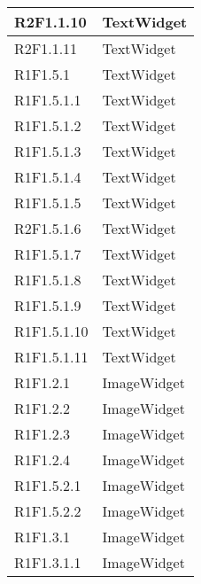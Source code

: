 \begin{center}
\begin{longtable}{|p{3cm}|p{10cm}|}
		R2F1.1.10 & TextWidget\newline \\ \hline
		R2F1.1.11 & TextWidget\newline \\ \hline
		R1F1.5.1 & TextWidget\newline \\ \hline
		R1F1.5.1.1 & TextWidget\newline \\ \hline
		R1F1.5.1.2 & TextWidget\newline \\ \hline
		R1F1.5.1.3 & TextWidget\newline \\ \hline
		R1F1.5.1.4 & TextWidget\newline \\ \hline
		R1F1.5.1.5 & TextWidget\newline \\ \hline
		R2F1.5.1.6 & TextWidget\newline \\ \hline
		R1F1.5.1.7 & TextWidget\newline \\ \hline
		R1F1.5.1.8 & TextWidget\newline \\ \hline
		R1F1.5.1.9 & TextWidget\newline \\ \hline
		R1F1.5.1.10 & TextWidget\newline \\ \hline
		R1F1.5.1.11 & TextWidget\newline \\ \hline
		R1F1.2.1 & ImageWidget\newline \\ \hline
		R1F1.2.2 & ImageWidget\newline \\ \hline
		R1F1.2.3 & ImageWidget\newline \\ \hline
		R1F1.2.4 & ImageWidget\newline \\ \hline
		R1F1.5.2.1 & ImageWidget\newline \\ \hline
		R1F1.5.2.2 & ImageWidget\newline \\ \hline
		R1F1.3.1 & ImageWidget\newline \\ \hline
		R1F1.3.1.1 & ImageWidget\newline \\ \hline

\end{longtable}
\end{center}
